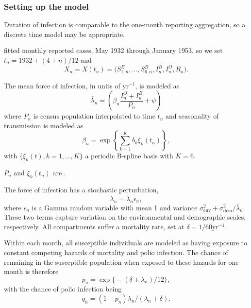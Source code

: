 \begin{frame}[fragile]

\frametitle{Setting up the model}

\bi

\item Duration of infection is comparable to the one-month reporting aggregation, so a discrete time model may be appropriate.

\item \citet{Martinez-Bakker2015} fitted monthly reported cases, May 1932 through January 1953, so we set $t_n=1932+ (4+n)/12$ and
$$X_n=X(t_n)=\big(S^B_{1,n},...,S^B_{6,n}, I^B_n,I^O_n,R_n \big).$$

\item The mean force of infection, in units of $\mathrm{yr}^{-1}$, is modeled as
$$\bar\lambda_n=\left( \beta_n \frac{I^O_n+I^B_n}{P_n} + \psi \right)$$
where $P_n$ is census population interpolated to time $t_n$ and seasonality of transmission is modeled as
$$\beta_n=\exp\left\{ \sum_{k=1}^K b_k\xi_k(t_n) \right\},$$
with $\{\xi_k(t),k=1,\dots,K\}$ a periodic B-spline basis with $K=6$.

\item $P_n$ and $\xi_k(t_n)$ are .

\ei

\end{frame}

\begin{frame}[fragile]

\bi
\item The force of infection has a stochastic perturbation,
$$\lambda_n = \bar\lambda_n \epsilon_n,$$
where $\epsilon_n$ is a Gamma random variable with mean 1 and variance $\sigma^2_{\mathrm{env}} + \sigma^2_{\mathrm{dem}}\big/\bar\lambda_n$. These two terms capture variation on the environmental and demographic scales, respectively. All compartments suffer a mortality rate, set at $\delta=1/60\mathrm{yr}^{-1}$. 

\item Within each month, all susceptible individuals are modeled as having exposure to constant competing hazards of mortality and polio infection.  The chance of remaining in the susceptible population when exposed to these hazards for one month is therefore
$$p_n = \exp\big\{ -(\delta+\lambda_n)/12\big\},$$
with the chance of polio infection being 
$$q_n = (1-p_n)\lambda_n\big/(\lambda_n+\delta).$$

\ei

\end{frame}

